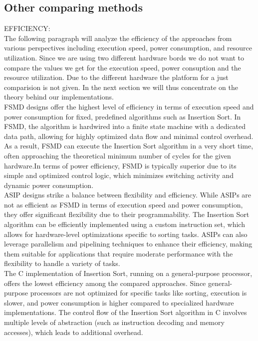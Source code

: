 \documentclass[conference]{IEEEtran}
\begin{document}
\subsection{Other comparing methods}
EFFICIENCY:\\
The following paragraph will analyze the efficiency of the approaches from various perspectives including execution speed, power consumption, and resource utilization. Since we are using two different hardware bords we do not want to compare the values we get for the execution speed, power consuption and the resource utilization. Due to the different hardware the platform for a just comparision is not given. In the next section we will thus concentrate on the theory behind our implementations.\\
FSMD designs offer the highest level of efficiency in terms of execution speed and power consumption for fixed, predefined algorithms such as Insertion Sort. In FSMD, the algorithm is hardwired into a finite state machine with a dedicated data path, allowing for highly optimized data flow and minimal control overhead. As a result, FSMD can execute the Insertion Sort algorithm in a very short time, often approaching the theoretical minimum number of cycles for the given hardware.In terms of power efficiency, FSMD is typically superior due to its simple and optimized control logic, which minimizes switching activity and dynamic power consumption.\\
ASIP designs strike a balance between flexibility and efficiency. While ASIPs are not as efficient as FSMD in terms of execution speed and power consumption, they offer significant flexibility due to their programmability. The Insertion Sort algorithm can be efficiently implemented using a custom instruction set, which allows for hardware-level optimizations specific to sorting tasks. ASIPs can also leverage parallelism and pipelining techniques to enhance their efficiency, making them suitable for applications that require moderate performance with the flexibility to handle a variety of tasks.\\
The C implementation of Insertion Sort, running on a general-purpose processor, offers the lowest efficiency among the compared approaches. Since general-purpose processors are not optimized for specific tasks like sorting, execution is slower, and power consumption is higher compared to specialized hardware implementations. The control flow of the Insertion Sort algorithm in C involves multiple levels of abstraction (such as instruction decoding and memory accesses), which leads to additional overhead.\\
\end{document}
